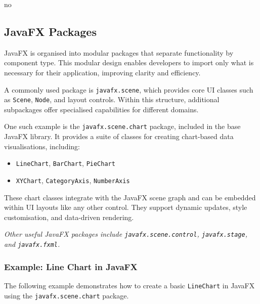 no\documentclass{article}
\newcommand{\codecmd}[1]{\textcolor[rgb]{0,0.5,0}{\texttt{#1}}}
\begin{document}
\subsection{JavaFX Packages}

JavaFX is organised into modular packages that separate functionality by component type. This modular design enables developers to import only what is necessary for their application, improving clarity and efficiency.

A commonly used package is \codecmd{javafx.scene}, which provides core UI classes such as \codecmd{Scene}, \codecmd{Node}, and layout controls. Within this structure, additional subpackages offer specialised capabilities for different domains.

One such example is the \codecmd{javafx.scene.chart} package, included in the base JavaFX library. It provides a suite of classes for creating chart-based data visualisations, including:

\begin{itemize}
    \item \codecmd{LineChart}, \codecmd{BarChart}, \codecmd{PieChart}
    \item \codecmd{XYChart}, \codecmd{CategoryAxis}, \codecmd{NumberAxis}
\end{itemize}

These chart classes integrate with the JavaFX scene graph and can be embedded within UI layouts like any other control. They support dynamic updates, style customisation, and data-driven rendering.

\medskip
\textit{Other useful JavaFX packages include \codecmd{javafx.scene.control}, \codecmd{javafx.stage}, and \codecmd{javafx.fxml}.}

\subsubsection{Example: Line Chart in JavaFX}

The following example demonstrates how to create a basic \codecmd{LineChart} in JavaFX using the \codecmd{javafx.scene.chart} package.
\end{document}
